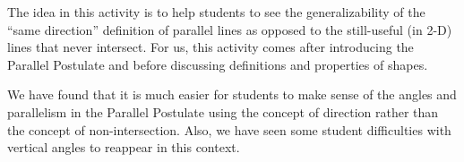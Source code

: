 \documentclass[nooutcomes]{ximera}
\begin{document}
\newpage

\begin{instructorNotes}
The idea in this activity is to help students to see the generalizability of the ``same direction'' definition of parallel lines as opposed to the still-useful (in 2-D) lines that never intersect.  For us, this activity comes after introducing the Parallel Postulate and before discussing definitions and properties of shapes.

We have found that it is much easier for students to make sense of the angles and parallelism in the Parallel Postulate using the concept of direction rather than the concept of non-intersection.  Also, we have seen some student difficulties with vertical angles to reappear in this context.

\end{instructorNotes}
\end{document}
